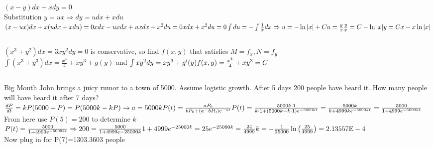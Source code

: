 \documentclass{article}
\begin{document}
\subsection{}
$(x-y)dx+xdy=0$
\\Substitution $y=ux \Rightarrow dy=udx+xdu$
\\$(x-ux)dx+x(udx+xdu)=0 \\ xdx-uxdx+uxdx+x^2du=0 \\ xdx+x^2du=0 \\ \int du= -\int \frac{1}{x}dx \Rightarrow u=-\ln |x|+C \\ u=\frac{y}{x} \\ \frac{y}{x}=C-\ln|x| \\ y=Cx-x\ln |x|$
\subsection{}
$(x^3+y^2)dx=3xy^2dy=0$ is conservative, so find $f(x,y)$ that satisfies $M=f_x, N=f_y$
\\$\int (x^3+y^3)dx = \frac{x^4}{4}+xy^3+g(y)$ and $\int xy^2dy = {xy^3} + g'(y) \\ f(x,y)=\frac{x^4}{4}+xy^3=C$
\subsection{}
Big Mouth John brings a juicy rumor to a town of 5000. Assume logistic growth. After 5 days 200 people have heard it. How many people will have heard it after 7 days?
$\frac{dP}{dt}=kP(5000-P) = P(5000k-kP) \rightarrow a=5000k \\ P(t)=\frac{aP_0}{bP_0+(a-bP_0)e^{-at}} \\ P(t)=\frac{5000k\cdot 1}{k \cdot 1 + (5000k-k\cdot 1)e^{-5000kt}}=\frac{5000k}{k+4999ke^{-5000kt}} = \frac{5000}{1+4999e^{-5000kt}}$
\\[0.05in]From here use $P(5)=200$ to determine $k$ 
\\[0.05in]$P(t)=\frac{5000}{1+4999e^{-5000kt}} \Rightarrow 200=\frac{5000}{1+4999e{-25000k}}
\\1+4999e^{-25000k}=25
\\e^{-25000k}=\frac{24}{4999} \\ k=-\frac{1}{25000}\ln\left(\frac{25}{4999}\right) = 2.13557\text{E}-4
$\\Now plug in for P(7)=1303.3603 people
\end{document}
